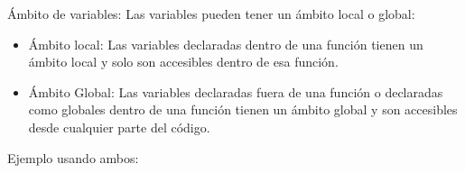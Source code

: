 Ámbito de variables: Las variables pueden tener un ámbito local o global:
\begin{itemize}
    \item Ámbito local: Las variables declaradas dentro de una función tienen un ámbito local y solo son accesibles dentro de esa función.
    \begin{figure}[h]
        \centering
      \end{figure}
    \item Ámbito Global: Las variables declaradas fuera de una función o declaradas como globales dentro de una función tienen un ámbito global y son accesibles desde cualquier parte del código.
    \begin{figure}[h]
        \centering
      \end{figure}
\end{itemize}
Ejemplo usando ambos:

\begin{figure}[h]
    \centering
  \end{figure}

